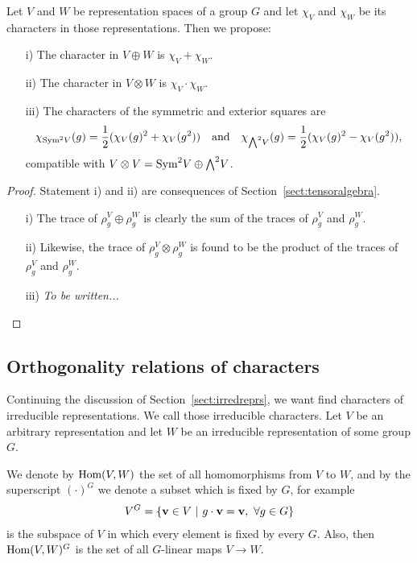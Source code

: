 \begin{proposition}\label{prop:charplustimes}
	Let $V$ and $W$ be representation spaces of a group $G$ and let $\chi_V$ and $\chi_W$ be its characters in those representations. Then we propose:
	\begin{enumerate}
		\item[i)] The character in $V \oplus W$ is $\chi_V+\chi_W$.
		\item[ii)] The character in $V \otimes W$ is $\chi_V \cdot \chi_W$.
		\item[iii)] The characters of the symmetric and exterior squares are \begin{align*}
			\chi_{\text{Sym}^2 V}(g) = \frac{1}{2}(\chi_V(g)^2 + \chi_V(g^2)) \quad \text{and} \quad \chi_{{\bigwedge}^2 V}(g) = \frac{1}{2}(\chi_V(g)^2 - \chi_V(g^2)),
		\end{align*} compatible with $V \otimes V = \text{Sym}^2 V \oplus {\bigwedge}^2 V$.
	\end{enumerate}
\end{proposition}
\begin{proof}
	Statement i) and ii) are consequences of Section~\ref{sect:tensoralgebra}. 
	\begin{enumerate}
		\item[i)] The trace of $\rho_g^V \oplus \rho_g^W$ is clearly the sum of the traces of $\rho_g^V$ and $\rho_g^W$.
		\item[ii)] Likewise, the trace of $\rho_g^V \otimes \rho_g^W$ is found to be the product of the traces of $\rho_g^V$ and $\rho_g^W$.
		\item[iii)] \textit{To be written...} \qedhere
	\end{enumerate}
\end{proof}


\subsection{Orthogonality relations of characters}

Continuing the discussion of Section~\ref{sect:irredreprs}, we want find characters of irreducible representations. We call those irreducible characters. Let $V$ be an arbitrary representation and let $W$ be an irreducible representation of some group $G$. 

We denote by $\text{Hom} (V,W)$ the set of all homomorphisms from $V$ to $W$, and by the superscript $(\cdot) ^G$ we denote a subset which is fixed by $G$, for example 
\begin{align}\label{eq:defVG}
	V^G = \left\lbrace \mathbf{v} \in V \ \middle\vert \ g\cdot \mathbf{v} = \mathbf{v}, \ \forall g \in G \right\rbrace
\end{align} 
is the subspace of $V$ in which every element is fixed by every $G$. Also, then $\text{Hom}(V,W)^G$ is the set of all $G$-linear maps $V \rightarrow W$.

